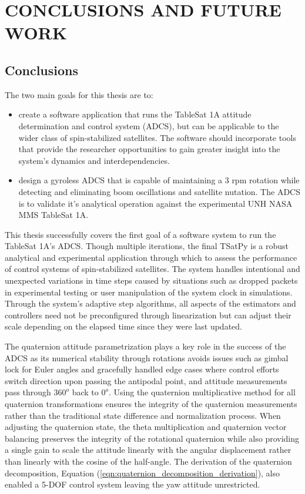 \chapter{CONCLUSIONS AND FUTURE WORK}
\label{chap:Conclusions}

\section{Conclusions}

The two main goals for this thesis are to:

\begin{itemize}
\item create a software application that runs the TableSat 1A attitude determination and control system (ADCS), but can be applicable to the wider class of spin-stabilized satellites.  The software should incorporate tools that provide the researcher opportunities to gain greater insight into the system's dynamics and interdependencies.
\item design a gyroless ADCS that is capable of maintaining a 3 rpm rotation while detecting and eliminating boom oscillations and satellite nutation.  The ADCS is to validate it's analytical operation against the experimental UNH NASA MMS TableSat 1A.
\end{itemize}

This thesis successfully covers the first goal of a software system to run the TableSat 1A's ADCS.  Though multiple iterations, the final TSatPy is a robust analytical and experimental application through which to assess the performance of control systems of spin-stabilized satellites.  The system handles intentional and unexpected variations in time steps caused by situations such as dropped packets in experimental testing or user manipulation of the system clock in simulations.  Through the system's adaptive step algorithms, all aspects of the estimators and controllers need not be preconfigured through linearization but can adjust their scale depending on the elapsed time since they were last updated.

The quaternion attitude parametrization plays a key role in the success of the ADCS as its numerical stability through rotations avoids issues such as gimbal lock for Euler angles and gracefully handled edge cases where control efforts switch direction upon passing the antipodal point, and attitude measurements pass through $360^o$ back to $0^o$.  Using the quaternion multiplicative method for all quaternion transformations ensures the integrity of the quaternion measurements rather than the traditional state difference and normalization process.  When adjusting the quaternion state, the theta multiplication and quaternion vector balancing preserves the integrity of the rotational quaternion while also providing a single gain to scale the attitude linearly with the angular displacement rather than linearly with the cosine of the half-angle.  The derivation of the quaternion decomposition, Equation (\ref{eqn:quaternion_decomposition_derivation}), also enabled a 5-DOF control system leaving the yaw attitude unrestricted.

